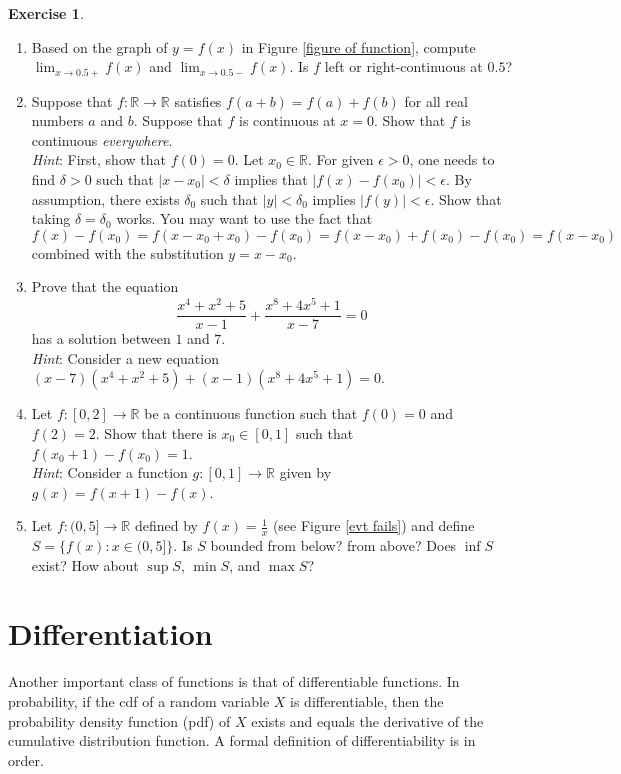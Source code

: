 \documentclass[12pt,letterpaper]{book}
\numberwithin{equation}{section}
\theoremstyle{definition}
\newtheorem{exercise}{\textbf{Exercise}}[chapter]
\begin{document}
\begin{exercise}\label{conti exer} \quad
\begin{enumerate}[\bfseries 1.]
\item Based on the graph of $y=f(x)$ in Figure \ref{figure of function}, compute $\displaystyle{\lim_{x\to 0.5+}f(x)}$ and $\displaystyle{\lim_{x\to 0.5-}f(x)}$. Is $f$ left or right-continuous at $0.5$?

\item\label{Cauchy ftl} Suppose that $f:\mathbb{R}\to \mathbb{R}$ satisfies $f(a+b)=f(a)+f(b)$ for all real numbers $a$ and $b$. Suppose that $f$ is continuous at $x=0$. Show that $f$ is continuous \textit{everywhere}.\\
\textit{Hint}: First, show that $f(0)=0$. Let $x_0\in \mathbb{R}$. For given $\epsilon>0$, one needs to find $\delta>0$ such that $|x-x_0|<\delta$ implies that $|f(x)-f(x_0)|<\epsilon$. By assumption, there exists $\delta_0$ such that $|y|<\delta_0$ implies $|f(y)|<\epsilon$. Show that taking $\delta=\delta_0$ works. You may want to use the fact that
$$f(x)-f(x_0)=f(x-x_0+x_0)-f(x_0)=f(x-x_0)+f(x_0)-f(x_0)=f(x-x_0)$$ combined with the substitution $y=x-x_0$.

\item Prove that the equation
$$\frac{x^4+x^2+5}{x-1}+\frac{x^8+4x^5+1}{x-7}=0$$
has a solution between $1$ and $7$.\\
\textit{Hint}: Consider a new equation $(x-7)(x^4+x^2+5)+(x-1)(x^8+4x^5+1)=0$.

\item Let $f:[0,2]\to \mathbb{R}$ be a continuous function such that $f(0)=0$ and $f(2)=2$. Show that there is $x_0\in [0,1]$ such that $f(x_0+1)-f(x_0)=1$.\\
    \textit{Hint}: Consider a function $g:[0,1]\to \mathbb{R}$ given by $g(x)=f(x+1)-f(x)$.

\item Let $f:(0,5]\to \mathbb{R}$ defined by $f(x)=\frac{1}{x}$ (see Figure \ref{evt fails}) and define $S=\{f(x):x\in (0,5]\}$. Is $S$ bounded from below? from above? Does $\inf S$ exist? How about $\sup S$, $\min S$, and $\max S$?
\end{enumerate}
\end{exercise}

\section{Differentiation}

Another important class of functions is that of differentiable functions. In probability, if the cdf of a random variable $X$ is differentiable, then the probability density function (pdf) of $X$ exists and equals the derivative of the cumulative distribution function. A formal definition of differentiability is in order.
\end{document}

